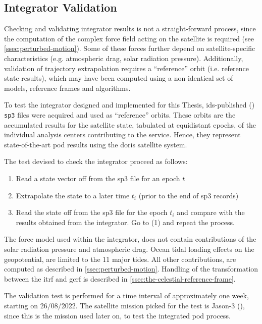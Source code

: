 \subsection{Integrator Validation}\label{sec:integrator-validation}

Checking and validating integrator results is not a straight-forward process, since 
the computation of the complex force field acting on the satellite is required 
(see \autoref{ssec:perturbed-motion}). Some of these forces further depend on 
satellite-specific characteristics (e.g. atmospheric drag, solar radiation 
pressure). Additionally, validation of trajectory extrapolation requires a ``reference'' 
orbit (i.e. reference state results), which may have been computed using a non 
identical set of models, reference frames and algorithms.

To test the integrator designed and implemented for this Thesis, \gls{ids}-published 
(\cite{Willis2016a}) \texttt{sp3} files were acquired and used as ``reference'' orbits. 
These orbits are the accumulated results for the satellite state, tabulated at 
equidistant epochs, of the individual analysis centers contributing to the service. 
Hence, they represent state-of-the-art \gls{pod} results using the \gls{doris} 
satellite system.

The test devised to check the integrator proceed as follows:
\begin{enumerate}
  \item Read a state vector off from the sp3 file for an epoch $t$
  \item Extrapolate the state to a later time $t_i$ (prior to the end of sp3 records)
  \item Read the state off from the sp3 file for the epoch $t_i$ and compare 
    with the results obtained from the integrator. Go to (1) and repeat the 
    process.
\end{enumerate}
The force model used within the integrator, does not contain contributions of the 
solar radiation pressure and atmospheric drag. Ocean tidal loading effects on the 
geopotential, are limited to the 11 major tides. All other contributions, are 
computed as described in \autoref{ssec:perturbed-motion}. Handling of the 
transformation between the \gls{itrf} and \gls{gcrf} is described in 
\autoref{ssec:the-celestial-reference-frame}.

The validation test is performed for a time interval of approximately one week, 
starting on 26/08/2022. The satellite mission picked for the test is Jason-3 
(\cite{Bannoura2011}), since this is the mission used later on, to test the 
integrated \gls{pod} process.

